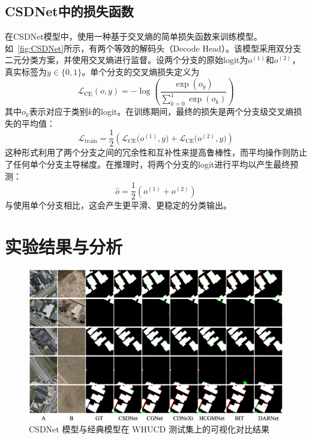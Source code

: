 \subsection{CSDNet中的损失函数}
在CSDNet模型中，使用一种基于交叉熵的简单损失函数来训练模型。如~\ref{fig:CSDNet}所示，有两个等效的解码头（Decode Head）。该模型采用双分支二元分类方案，并使用交叉熵进行监督。设两个分支的原始logit为\(o^{(1)}\)和\(o^{(2)}\)，真实标签为\(y\in\{0,1\}\)。单个分支的交叉熵损失定义为
\begin{equation}
\mathcal{L}_{\mathrm{CE}}(o, y)
= -\log\left(\frac{\exp(o_{y})}{\sum_{k=0}^1 \exp(o_{k})}\right)
\end{equation}
其中\(o_k\)表示对应于类别\(k\)的logit。在训练期间，最终的损失是两个分支级交叉熵损失的平均值：
\begin{equation}
\mathcal{L}_{\text{train}}
= \frac{1}{2}\left(\mathcal{L}_{\mathrm{CE}}\bigl(o^{(1)}, y\bigr)
+ \mathcal{L}_{\mathrm{CE}}\bigl(o^{(2)}, y\bigr)\right)
\end{equation}
这种形式利用了两个分支之间的冗余性和互补性来提高鲁棒性，而平均操作则防止了任何单个分支主导梯度。在推理时，将两个分支的logit进行平均以产生最终预测：
\begin{equation}
\hat{o} = \frac{1}{2}\left(o^{(1)} + o^{(2)}\right)
\end{equation}
与使用单个分支相比，这会产生更平滑、更稳定的分类输出。

\section{实验结果与分析}

\begin{figure}[!htb]
	\centering
	\includegraphics[width=\linewidth]{paper_figures/基于双时相遥感影像风格解缠和内容细化增强遥感变化检测方法/csdnet_whucd.png}
    \caption{CSDNet 模型与经典模型在 WHUCD 测试集上的可视化对比结果}
	\label{fig:csdnet_whucd}
\end{figure}

